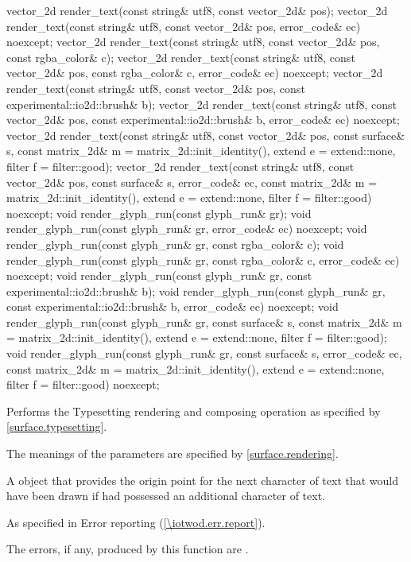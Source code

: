 \begin{itemdecl}
vector_2d render_text(const string& utf8, const vector_2d& pos);
vector_2d render_text(const string& utf8, const vector_2d& pos,
  error_code& ec) noexcept;
vector_2d render_text(const string& utf8, const vector_2d& pos,
  const rgba_color& c);
vector_2d render_text(const string& utf8, const vector_2d& pos,
  const rgba_color& c, error_code& ec) noexcept;
vector_2d render_text(const string& utf8, const vector_2d& pos,
  const experimental::io2d::brush& b);
vector_2d render_text(const string& utf8, const vector_2d& pos,
  const experimental::io2d::brush& b, error_code& ec) noexcept;
vector_2d render_text(const string& utf8, const vector_2d& pos,
  const surface& s, const matrix_2d& m = matrix_2d::init_identity(), 
  extend e = extend::none, filter f = filter::good);
vector_2d render_text(const string& utf8, const vector_2d& pos,
  const surface& s, error_code& ec,
  const matrix_2d& m = matrix_2d::init_identity(), extend e = extend::none, 
  filter f = filter::good) noexcept;
void render_glyph_run(const glyph_run& gr);
void render_glyph_run(const glyph_run& gr, error_code& ec) noexcept;
void render_glyph_run(const glyph_run& gr, const rgba_color& c);
void render_glyph_run(const glyph_run& gr, const rgba_color& c,
  error_code& ec) noexcept;
void render_glyph_run(const glyph_run& gr,
  const experimental::io2d::brush& b);
void render_glyph_run(const glyph_run& gr,
  const experimental::io2d::brush& b, error_code& ec) noexcept;
void render_glyph_run(const glyph_run& gr, const surface& s,
  const matrix_2d& m = matrix_2d::init_identity(), extend e = extend::none,
  filter f = filter::good);
void render_glyph_run(const glyph_run& gr, const surface& s, error_code& ec, 
  const matrix_2d& m = matrix_2d::init_identity(), extend e = extend::none, 
  filter f = filter::good) noexcept;
\end{itemdecl}
\begin{itemdescr}
\pnum
\effects
Performs the Typesetting rendering and composing operation as specified by \ref{surface.typesetting}.

\pnum
The meanings of the parameters are specified by \ref{surface.rendering}.

\pnum
\returns
A  object that provides the origin point for the next character of text that would have been drawn  if  had possessed an additional character of text.

\pnum
\throws
As specified in Error reporting (\ref{\iotwod.err.report}).

\pnum
\errors
The errors, if any, produced by this function are .
\end{itemdescr}

